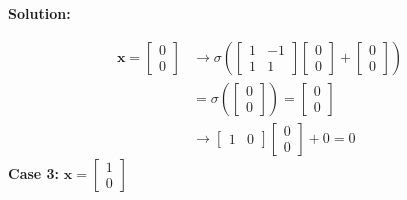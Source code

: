 \documentclass{article}
\newenvironment{solution}
  {\par\noindent\textbf{Solution:}\par}
  {\par}
\begin{document}
\begin{solution}
\[ 
\begin{aligned}
\mathbf{x}= \begin{bmatrix}
0 \\
0
\end{bmatrix} &\to \sigma(\begin{bmatrix}
1 & -1  \\
1 & 1
\end{bmatrix}\begin{bmatrix}
0 \\
0
\end{bmatrix} + \begin{bmatrix}
0 \\
0
\end{bmatrix}) \\
&= \sigma(\begin{bmatrix}
0  \\
0
\end{bmatrix}) = \begin{bmatrix}
0 \\
0
\end{bmatrix} \\ 
&\to \begin{bmatrix}
1 & 0
\end{bmatrix}\begin{bmatrix}
0 \\
0
\end{bmatrix}+0 = 0 
\end{aligned}
\]
\textbf{Case 3:} $\mathbf{x}= \begin{bmatrix}
1 \\
0
\end{bmatrix}$


\end{solution}
\end{document}
